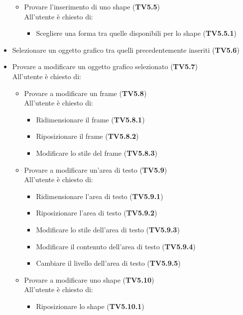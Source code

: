 \begin{itemize}
\begin{itemize}
\begin{itemize}
        \end{itemize}
        \item Provare l'inserimento di uno shape  (\textbf{TV5.5})\\
        All'utente è chiesto di:		
        \begin{itemize}
        	\item Scegliere una forma tra quelle disponibili per lo shape (\textbf{TV5.5.1})
        \end{itemize}
	\end{itemize}
	\item Selezionare un oggetto grafico tra quelli precedentemente inseriti (\textbf{TV5.6})
	\item Provare a modificare un oggetto grafico selezionato (\textbf{TV5.7})\\
	All'utente è chiesto di:
    \begin{itemize}
		\item Provare a modificare un frame (\textbf{TV5.8})\\
			All'utente è chiesto di:
			\begin{itemize}
				\item Ridimensionare il frame (\textbf{TV5.8.1})
				\item Riposizionare il frame (\textbf{TV5.8.2})
				\item Modificare lo stile del frame  (\textbf{TV5.8.3})
		    \end{itemize}
		 \item Provare a modificare un'area di testo (\textbf{TV5.9})\\
		 	All'utente è chiesto di:
		 	\begin{itemize}
		 		\item Ridimensionare l'area di testo (\textbf{TV5.9.1})
		 		\item Riposizionare l'area di testo (\textbf{TV5.9.2})
		 		\item Modificare lo stile dell'area di testo (\textbf{TV5.9.3})
		 		\item Modificare il contenuto dell'area di testo (\textbf{TV5.9.4})
		 		\item Cambiare il livello dell'area di testo (\textbf{TV5.9.5})
		 	\end{itemize}
		 \item Provare a modificare uno shape (\textbf{TV5.10})\\
		 All'utente è chiesto di:
		 \begin{itemize}
		 	\item Riposizionare lo shape (\textbf{TV5.10.1})

\end{itemize}
\end{itemize}
\end{itemize}
